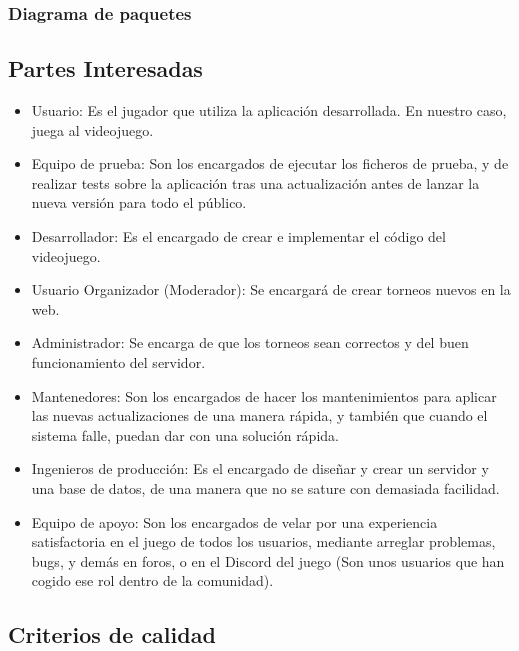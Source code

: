 \documentclass{article}
\begin{document}
\subsubsection{Diagrama de paquetes}
\subsection{Partes Interesadas}

\begin{itemize}
    \item Usuario: Es el jugador que utiliza la aplicación desarrollada. En nuestro caso, juega al videojuego.
    \item Equipo de prueba: Son los encargados de ejecutar los ficheros de prueba, y de realizar tests sobre
    la aplicación tras una actualización antes de lanzar la nueva versión para todo el público.
    \item Desarrollador: Es el encargado de crear e implementar el código del videojuego.
    \item Usuario Organizador (Moderador): Se encargará de crear torneos nuevos en la web.
    \item Administrador: Se encarga de que los torneos sean correctos y del buen funcionamiento del servidor.
    \item Mantenedores: Son los encargados de hacer los mantenimientos para aplicar las nuevas actualizaciones de una manera rápida, y también que cuando el sistema falle, puedan dar con una solución rápida.
    \item Ingenieros de producción: Es el encargado de diseñar y crear un servidor y una base de datos, de una manera que no se sature con demasiada facilidad.
    \item Equipo de apoyo: Son los encargados de velar por una experiencia satisfactoria en el juego de todos los usuarios, mediante arreglar problemas, bugs, y demás en foros, o en el Discord del juego (Son unos usuarios que han cogido ese rol dentro de la comunidad).
\end{itemize}

\subsection{Criterios de calidad} 
\end{document}
